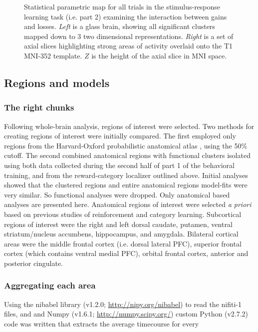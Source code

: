 \documentclass[doc,12pt]{apa}        %
\begin{document}
\begin{figure}[tp]
    \centering
	\caption{Statistical parametric map for all trials in the stimulus-response learning task (i.e. part 2) examining the interaction between gains and losses.  \emph{Left} is a glass brain, showing all significant clusters mapped down to 3 two dimensional representations.  \emph{Right} is a set of axial slices highlighting strong areas of activity overlaid onto the T1 MNI-352 template.  $Z$ is the height of the axial slice in MNI space.}
	\label{fig:gxl}
\end{figure}

\subsection{Regions and models}
\label{sub:regoins}
\subsubsection{The right chunks}
\label{sub:chunks}
Following whole-brain analysis, regions of interest were selected.  Two methods for creating regions of interest were initially compared.  The first employed only regions from the Harvard-Oxford probabilistic anatomical atlas \cite{Desikan:2006p9370}, using the 50\% cutoff.  The second combined anatomical regions with functional clusters isolated using both data collected during the second half of part 1 of the behavioral training, and from the reward-category localizer outlined above.  Initial analyses showed that the clustered regions and entire anatomical regions model-fits were very similar.  So functional analyses were dropped.  Only anatomical based analyses are presented here.  Anatomical regions of interest were selected \emph{a priori} based on previous studies of reinforcement and category learning.  Subcortical regions of interest were the right and left dorsal caudate, putamen, ventral striatum/nucleus accumbens, hippocampus, and amygdala.   Bilateral cortical areas were the middle frontal cortex (i.e. dorsal lateral PFC), superior frontal cortex (which contains ventral medial PFC), orbital frontal cortex, anterior and posterior cingulate.

\subsubsection{Aggregating each area}
\label{sub:aggregating}
Using the nibabel library (v1.2.0; \url{http://nipy.org/nibabel}) to read the nifiti-1 files, and and Numpy (v1.6.1; \url{http://numpy.scipy.org/}) custom Python (v2.7.2) code was written that extracts the average timecourse for every

\newpage

\end{document}
